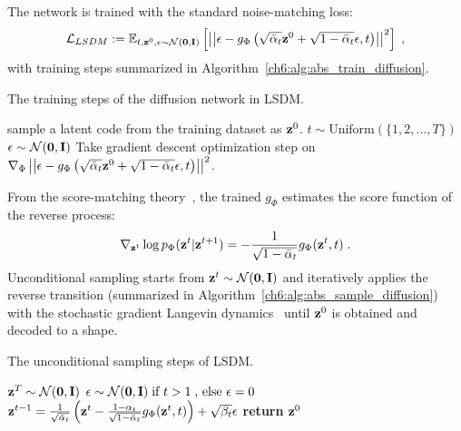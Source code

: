 The network is trained with the standard noise-matching loss:
\begin{equation}
    \mathcal{L}_{LSDM} := \mathbb{E}_{t, \mathbf{z}^0, \mathbf{\epsilon}\sim \mathcal{N}(\textbf{0}, \mathbf{I})} 
    \left[ \left| \left|
    \mathbf{\epsilon} - g_\Phi \left(\sqrt{\Bar{\alpha}_t} \mathbf{z}^0 + \sqrt{1-\Bar{\alpha}_t}\mathbf{\epsilon}, t \right)
    \right|\right| ^ 2\right]\;,
\end{equation}
with training steps summarized in Algorithm~\ref{ch6:alg:abs_train_diffusion}.
\begin{algorithm}
    \caption{The training steps of the diffusion network in LSDM.}
    \label{ch6:alg:abs_train_diffusion}
    \begin{algorithmic}
            \State sample a latent code from the training dataset as $\mathbf{z}^0$.
            \State $t \sim \text{Uniform}(\{1,2,...,T\})$ 
            \State $\mathbf{\epsilon} \sim \mathcal{N}(\mathbf{0}, \mathbf{I})$
            \State Take gradient descent optimization step on $\nabla_\Phi \left|\left| \mathbf{\epsilon} - g_\Phi \left(\sqrt{\Bar{\alpha}_t} \mathbf{z}^0 + \sqrt{1-\Bar{\alpha}_t}\mathbf{\epsilon}, t \right) \right|\right|^2$.
        \EndWhile
    \end{algorithmic}
\end{algorithm}

From the score-matching theory~\cite{ai.Song2021c}, the trained $g_\Phi$ estimates the score function of the reverse process: 
\begin{equation}
    \nabla_{\mathbf{z}^t} \log p_\Phi(\mathbf{z}^t|\mathbf{z}^{t+1})=-\frac{1}{\sqrt{1-\Bar{\alpha}_t}}  g_\Phi(\mathbf{z}^t, t) \;.
\end{equation}
Unconditional sampling starts from $\mathbf{z}^t\sim \mathcal{N}(\textbf{0}, \mathbf{I})$ and iteratively applies the reverse transition (summarized in Algorithm~\ref{ch6:alg:abs_sample_diffusion}) with the stochastic gradient Langevin dynamics~\cite{ai.Welling2011} until $\mathbf{z}^0$ is obtained and decoded to a shape.

\begin{algorithm}
    \caption{The unconditional sampling steps of LSDM.}
    \label{ch6:alg:abs_sample_diffusion}
    \begin{algorithmic}
        \State $\mathbf{z}^T \sim \mathcal{N}(\mathbf{0}, \mathbf{I})$
            \State $\mathbf{\epsilon} \sim \mathcal{N}(\mathbf{0}, \mathbf{I})\;\text{if } t>1\;\text{, else } \mathbf{\epsilon}=0$ 
            \State $\mathbf{z}^{t-1} = \frac{1}{\sqrt{\Bar{\alpha}_t}} \left(\mathbf{z}^t - \frac{1-\alpha_t}{\sqrt{1-\Bar{\alpha}_t}} g_\Phi(\mathbf{z}^t, t) \right) + \sqrt{\beta_t}\mathbf{\epsilon}$
        \EndFor 
        \State \textbf{return} {$\mathbf{z}^0$}
    \end{algorithmic}
\end{algorithm}

